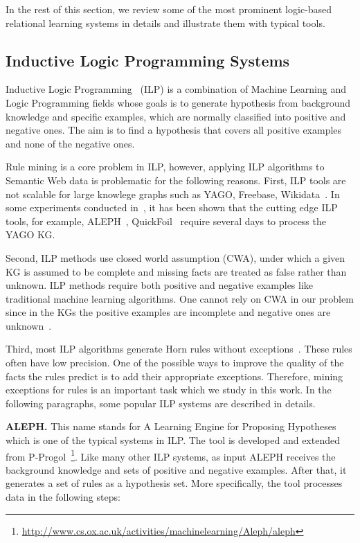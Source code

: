 In the rest of this section, we review some of the most prominent logic-based relational learning systems in details and illustrate them with typical tools.

\subsection{Inductive Logic Programming Systems}

Inductive Logic Programming~\cite{ref9} (ILP) is a combination of Machine Learning and Logic Programming fields whose goals is to generate hypothesis from background knowledge and specific examples, which are normally classified into positive and negative ones. The aim is to find a hypothesis that covers all positive examples and none of the negative ones.

Rule mining is a core problem in ILP, however, applying ILP algorithms to Semantic Web data is problematic for the following reasons. First, ILP tools are not scalable for large knowlege graphs such as YAGO, Freebase, Wikidata~\cite{ref10}. In some experiments conducted in~\cite{ref10}, it has been shown that the cutting edge ILP tools, for example, ALEPH~\cite{ref14, ref10}, QuickFoil~\cite{ref15, ref10} require several days to process the YAGO KG.

Second, ILP methods use closed world assumption (CWA), under which a given KG is assumed to be complete and missing facts are treated as false rather than unknown. ILP methods require both positive and negative examples like traditional machine learning algorithms. One cannot rely on CWA in our problem since in the KGs the positive examples are incomplete and negative ones are unknown~\cite{ref10}.

Third, most ILP algorithms generate Horn rules without exceptions~\cite{ref11}. These rules often have low precision. One of the possible ways to improve the quality of the facts the rules predict is to add their appropriate exceptions. Therefore, mining exceptions for rules is an important task which we study in this work. In the following paragraphs, some popular ILP systems are described in details.

\textbf{ALEPH.} This name stands for A Learning Engine for Proposing Hypotheses which is one of the typical systems in ILP. The tool is developed and extended from P-Progol~\footnote{\url{http://www.cs.ox.ac.uk/activities/machinelearning/Aleph/aleph}}. Like many other ILP systems, as input ALEPH receives the background knowledge and sets of positive and negative examples. After that, it generates a set of rules as a hypothesis set. More specifically, the tool processes data in the following steps:

